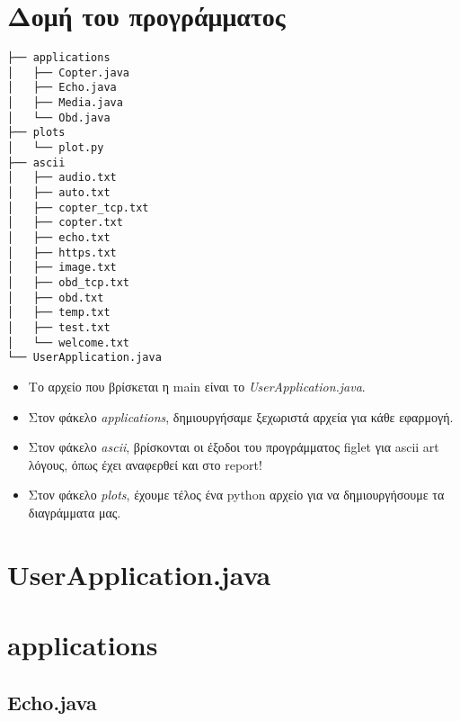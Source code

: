 \documentclass[hidelinks, 12pt, a4paper]{article}
\begin{document}
\sloppy %




\pagebreak
\tableofcontents
\pagebreak


\section{Δομή του προγράμματος}

\vspace{1cm}

\begin{verbatim}
├── applications
│   ├── Copter.java
│   ├── Echo.java
│   ├── Media.java
│   └── Obd.java
├── plots
│   └── plot.py
├── ascii
│   ├── audio.txt
│   ├── auto.txt
│   ├── copter_tcp.txt
│   ├── copter.txt
│   ├── echo.txt
│   ├── https.txt
│   ├── image.txt
│   ├── obd_tcp.txt
│   ├── obd.txt
│   ├── temp.txt
│   ├── test.txt
│   └── welcome.txt
└── UserApplication.java
\end{verbatim}


\begin{itemize}
    \item Το αρχείο που βρίσκεται η main είναι το \emph{UserApplication.java}.
    \item Στον φάκελο \emph{applications}, δημιουργήσαμε ξεχωριστά αρχεία για κάθε εφαρμογή.
    \item Στον φάκελο \emph{ascii}, βρίσκονται οι έξοδοι του προγράμματος figlet για ascii art λόγους, όπως έχει αναφερθεί και στο report!
    \item Στον φάκελο \emph{plots}, έχουμε τέλος ένα python αρχείο για να δημιουργήσουμε τα διαγράμματα μας.
\end{itemize}


\pagebreak

\section{UserApplication.java}



\section{applications}

\subsection{Echo.java}
\end{document}
